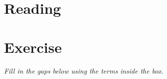 \documentclass{article}
\begin{document}
%
%
%
%
%
%
%
%
%
%
%
%
%
%
%
%
%
%
%
%

\newpage
\section{Reading}


%
%
%
%
%
%
%
%
%
%
%
%
%
%
%
%
%
%
%
%



\newpage
\section{Exercise}

\noindent \textit{Fill in the gaps below using the terms inside the box.}

%
%
%
%
%
%
%
%
%
%
%
%
%
%
%
%
%
%
%
%
\end{document}
